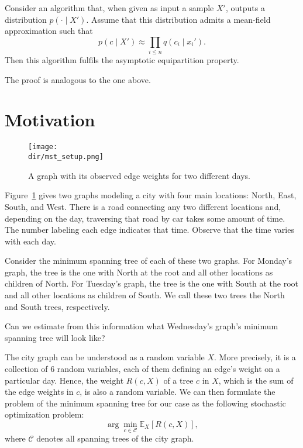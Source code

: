 \begin{corollary}
Consider an algorithm that, when given as input a sample $X'$, outputs a distribution $p(\cdot \mid X')$. Assume that this distribution admits a mean-field approximation such that
%
\begin{equation}
p(c \mid X') \approx \prod_{i \leq n} q(c_i \mid x_i').
\end{equation}
%
Then this algorithm fulfils the asymptotic equipartition property.
\end{corollary}

The proof is analogous to the one above.


\section{Motivation}

\begin{figure}
\texttt{[image: \\dir/mst\_setup.png]}
\caption{A graph with its observed edge weights for two different days.}
\label{fig:mst_setup}
\end{figure}

Figure~\ref{fig:mst_setup} gives two graphs modeling a city with four main locations: North, East, South, and West. There is a road connecting any two different locations and, depending on the day, traversing that road by car takes some amount of time. The number labeling each edge indicates that time. Observe that the time varies with each day.

Consider the minimum spanning tree of each of these two graphs. For Monday's graph, the tree is the one with North at the root and all other locations as children of North. For Tuesday's graph, the tree is the one with South at the root and all other locations as children of South. We call these two trees the North and South trees, respectively.

Can we estimate from this information what Wednesday's graph's minimum spanning tree will look like?

The city graph can be understood as a random variable $X$. More precisely, it is a collection of 6 random variables, each of them defining an edge's weight on a particular day. Hence, the weight $R(c, X)$ of a tree $c$ in $X$, which is the sum of the edge weights in $c$, is also a random variable. We can then formulate the problem of the minimum spanning tree for our case as the following stochastic optimization problem:
%
\begin{equation}
\arg \min_{c \in \mathcal{C}} \mathbb{E}_X\left[R(c, X)\right],
\label{eq:stoch_min_span_tree}
\end{equation}
%
where $\mathcal{C}$ denotes all spanning trees of the city graph.

